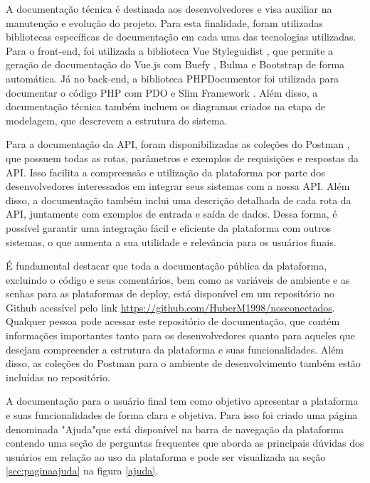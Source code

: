 \documentclass[tcc,capa]{texufpel}
\begin{document}
A documentação técnica é destinada aos desenvolvedores e visa auxiliar na manutenção e evolução do projeto. Para esta finalidade, foram utilizadas bibliotecas específicas de documentação em cada uma das tecnologias utilizadas. Para o front-end, foi utilizada a biblioteca Vue Styleguidist \cite{VueStyleguidist:2023}, que permite a geração de documentação do Vue.js \cite{vue:2014} com Buefy \cite{buefy:2022}, Bulma \cite{bulma:2022} e Bootstrap \cite{bootstrap:2023} de forma automática. Já no back-end, a biblioteca PHPDocumentor \cite{PHPDocumentor:2023} foi utilizada para documentar o código PHP \cite{PHP:2022} com PDO \cite{PDO:2022} e Slim Framework \cite{slim:2023}. Além disso, a documentação técnica também incluem os diagramas criados na etapa de modelagem, que descrevem a estrutura do sistema.

Para a documentação da API, foram disponibilizadas as coleções do Postman \cite{Postman:2023}, que possuem todas as rotas, parâmetros e exemplos de requisições e respostas da API. Isso facilita a compreensão e utilização da plataforma por parte dos desenvolvedores interessados em integrar seus sistemas com a nossa API. Além disso, a documentação também inclui uma descrição detalhada de cada rota da API, juntamente com exemplos de entrada e saída de dados. Dessa forma, é possível garantir uma integração fácil e eficiente da plataforma com outros sistemas, o que aumenta a sua utilidade e relevância para os usuários finais.

É fundamental destacar que toda a documentação pública da plataforma, excluindo o código e seus comentários, bem como as variáveis de ambiente e as senhas para as plataformas de deploy, está disponível em um repositório no Github acessível pelo link \href{https://github.com/HuberM1998/nosconectados}{https://github.com/HuberM1998/nosconectados}. Qualquer pessoa pode acessar este repositório de documentação, que contém informações importantes tanto para os desenvolvedores quanto para aqueles que desejam compreender a estrutura da plataforma e suas funcionalidades. Além disso, as coleções do Postman para o ambiente de desenvolvimento também estão incluídas no repositório.

A documentação para o usuário final tem como objetivo apresentar a plataforma e suas funcionalidades de forma clara e objetiva. Para isso foi criado uma página denominada "Ajuda"\space que está disponível na barra de navegação da plataforma contendo uma seção de perguntas frequentes que aborda as principais dúvidas dos usuários em relação ao uso da plataforma e pode ser visualizada na seção \ref{sec:paginaajuda} na figura \ref{ajuda}.
\end{document}
